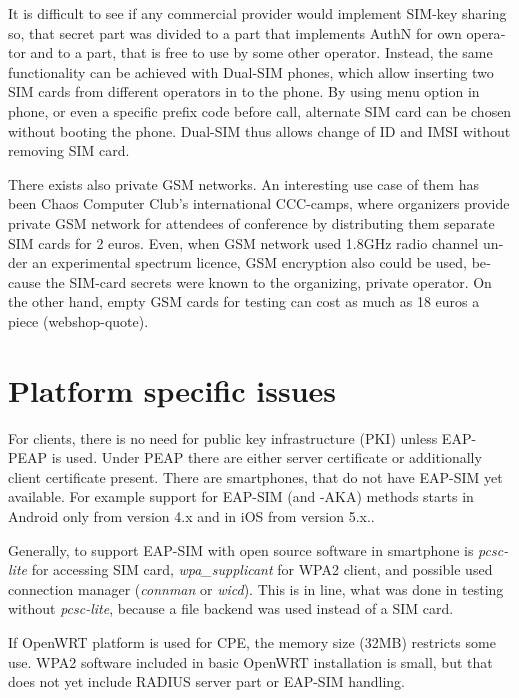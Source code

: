 \documentclass[12pt,a4paper,english]{tutthesis}
\begin{document}
\begin{otherlanguage}{english}
It is difficult to see if any commercial provider would implement
SIM-key sharing so, that secret part was divided to a part that
implements AuthN for own operator and to a part, that is free to use by
some other operator.  Instead, the same functionality can be achieved with
Dual-SIM phones, which allow inserting two SIM cards from different
operators in to the phone. By using menu option in phone, or even a
specific prefix code before call, alternate SIM card can be chosen
without booting the phone.
Dual-SIM thus allows change of ID and IMSI without removing SIM card.

There exists also private GSM networks. An interesting use case
of them  has been Chaos Computer Club's international 
CCC-camps\cite{ccc}, where organizers 
provide private GSM network for attendees of conference
by distributing them separate SIM cards for 2 euros.  Even, when GSM
network used 1.8GHz radio channel under an experimental spectrum
licence,  GSM encryption also could be used, because the SIM-card secrets were known
to the organizing, private operator.
On the other hand, empty GSM cards for testing can cost as much as 
18 euros a piece (webshop-quote\cite{smartjac-testsim}).


\section{Platform specific issues}
\label{sec-6-3}

For clients, there is no need for public key infrastructure (PKI) 
unless EAP-PEAP is used. Under PEAP there are either server
certificate or additionally client certificate present.
There are smartphones, that do not have EAP-SIM yet available.
For example support for
EAP-SIM (and -AKA) methods starts in Android only from version 4.x and in
iOS from version 5.x.\cite{sim-support}.


Generally, to support EAP-SIM  with open source software in 
smartphone is \emph{pcsc-lite} for accessing SIM card, \emph{wpa\_supplicant} for
WPA2 client, and possible used connection manager (\emph{connman} or
\emph{wicd}). This is in line, what was done in testing without \emph{pcsc-lite},
because a file backend was used instead of a SIM card.





If OpenWRT platform  is used for CPE, the memory size (32MB) restricts some
use.
WPA2 software included in basic OpenWRT installation is small,
but that does not yet include RADIUS server part or EAP-SIM handling.



\end{otherlanguage}
\end{document}
